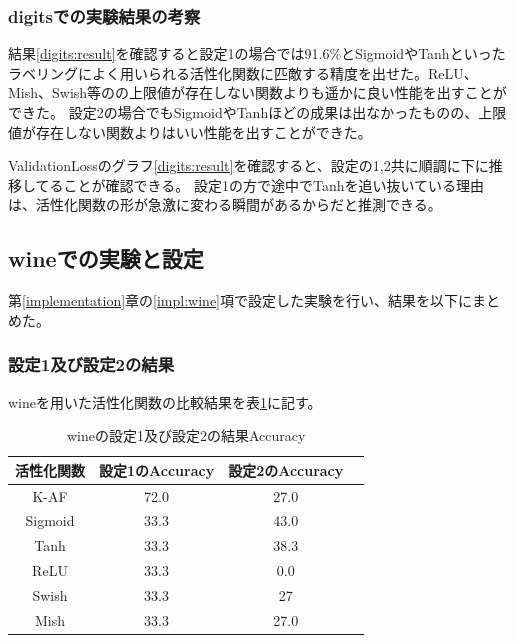 \subsubsection{digitsでの実験結果の考察}
結果\ref{digits:result}を確認すると設定1の場合では91.6\%とSigmoidやTanhといったラベリングによく用いられる活性化関数に匹敵する精度を出せた。ReLU、Mish、Swish等のの上限値が存在しない関数よりも遥かに良い性能を出すことができた。
設定2の場合でもSigmoidやTanhほどの成果は出なかったものの、上限値が存在しない関数よりはいい性能を出すことができた。

ValidationLossのグラフ\ref{digits:result}を確認すると、設定の1,2共に順調に下に推移してることが確認できる。
設定1の方で途中でTanhを追い抜いている理由は、活性化関数の形が急激に変わる瞬間があるからだと推測できる。


\subsection{wineでの実験と設定}
\label{ev:wineでの実験と設定}

第\ref{implementation}章の\ref{impl:wine}項で設定した実験を行い、結果を以下にまとめた。
\subsubsection{設定1及び設定2の結果}

wineを用いた活性化関数の比較結果を表\ref{result:winetable}に記す。


\begin{table}[htbp]
    \begin{center}
        \caption{wineの設定1及び設定2の結果Accuracy}
        \label{result:winetable}
        \vspace{2mm} 
        \begin{tabular}{|c|c|c|c|}
            \hline
            活性化関数              & 設定1のAccuracy &  設定2のAccuracy \\
            \hline
            K-AF            & 72.0 & 27.0 \\
            \hline
            Sigmoid            & 33.3 & 43.0\\
            \hline
            Tanh            & 33.3 & 38.3\\
            \hline
            ReLU        & 33.3 & 0.0\\
            \hline
            Swish           & 33.3 & 27 \\
            \hline
            Mish           & 33.3 &  27.0\\
            \hline
    
        \end{tabular}
    \end{center}
\end{table}


